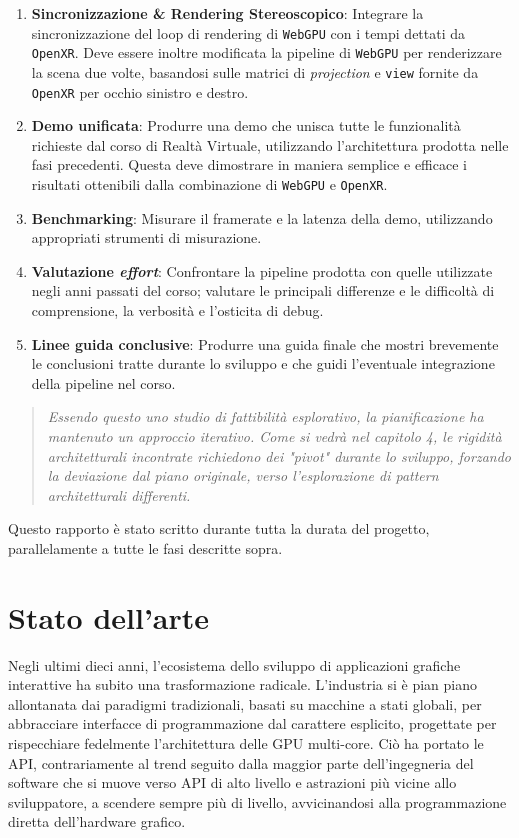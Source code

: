 \documentclass[a4paper, 11pt, twoside]{report}
\newif\ifshowlogo
\newcommand{\blankpage}{
    \clearpage
    \thispagestyle{empty}     %
    \showlogofalse            %
    \hbox{}                   %
    \newpage
    \showlogotrue             %
}
\begin{document}
\begin{enumerate}
    \item \textbf{Sincronizzazione \& Rendering Stereoscopico}: Integrare la sincronizzazione del loop di
        rendering di \texttt{WebGPU} con i tempi dettati da \texttt{\gls{OpenXR}}.
        Deve essere inoltre modificata la pipeline di \texttt{WebGPU} per renderizzare la scena due volte, basandosi
        sulle matrici di \textit{projection} e \texttt{view} fornite da \texttt{\gls{OpenXR}} per occhio sinistro e
        destro.
    \item \textbf{Demo unificata}: Produrre una demo che unisca tutte le funzionalità richieste dal corso di Realtà
        Virtuale, utilizzando l'architettura prodotta nelle fasi precedenti. Questa deve dimostrare in maniera semplice
        e efficace i risultati ottenibili dalla combinazione di \texttt{WebGPU} e \texttt{\gls{OpenXR}}.
    \item \textbf{Benchmarking}: Misurare il \gls{framerate} e la latenza della demo, utilizzando appropriati strumenti
        di misurazione.
    \item \textbf{Valutazione \textit{effort}}: Confrontare la pipeline prodotta con quelle utilizzate negli anni
        passati del corso; valutare le principali differenze e le difficoltà di comprensione, la verbosità e
        l'osticita di debug.
    \item \textbf{Linee guida conclusive}: Produrre una guida finale che mostri brevemente le conclusioni tratte durante
        lo sviluppo e che guidi l'eventuale integrazione della pipeline nel corso.
\end{enumerate}

\begin{quote}
\itshape
Essendo questo uno studio di fattibilità esplorativo, la pianificazione ha mantenuto un approccio iterativo.
Come si vedrà nel capitolo 4, le rigidità architetturali incontrate richiedono dei "pivot" durante lo sviluppo,
forzando la deviazione dal piano originale, verso l'esplorazione di pattern architetturali differenti.
\end{quote}

Questo rapporto è stato scritto durante tutta la durata del progetto, parallelamente a tutte le fasi descritte sopra.

\blankpage

\chapter{Stato dell'arte}

Negli ultimi dieci anni, l'ecosistema dello sviluppo di applicazioni grafiche interattive ha subito una trasformazione
radicale. L'industria si è pian piano allontanata dai paradigmi tradizionali, basati su macchine a stati globali, per
abbracciare interfacce di programmazione dal carattere esplicito, progettate per rispecchiare fedelmente
l'architettura delle GPU multi-core. Ciò ha portato le API, contrariamente al trend seguito dalla maggior parte
dell'ingegneria del software che si muove verso API di alto livello e astrazioni più vicine allo sviluppatore, a
scendere sempre più di livello, avvicinandosi alla programmazione diretta dell'hardware grafico.
\end{document}
